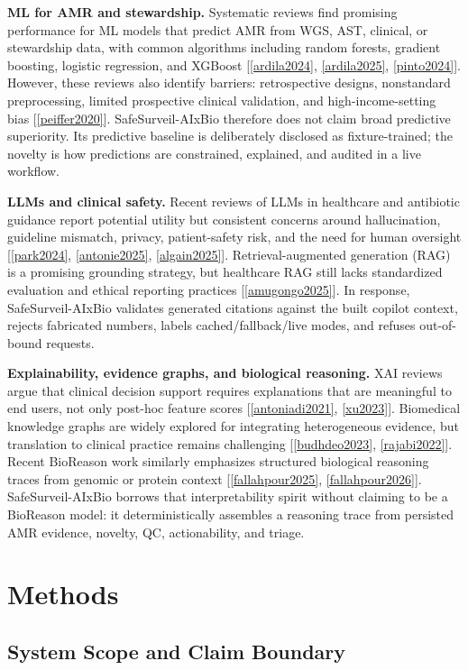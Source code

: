 \documentclass[11pt, letterpaper]{article}
\newcommand{\project}{SafeSurveil-AIxBio}
\newcommand{\pcite}[1]{[\ref{#1}]}
\begin{document}
\textbf{ML for AMR and stewardship.} Systematic reviews find promising performance for ML models that predict AMR from WGS, AST, clinical, or stewardship data, with common algorithms including random forests, gradient boosting, logistic regression, and XGBoost [\ref{ardila2024}, \ref{ardila2025}, \ref{pinto2024}]. However, these reviews also identify barriers: retrospective designs, nonstandard preprocessing, limited prospective clinical validation, and high-income-setting bias \pcite{peiffer2020}. \project{} therefore does not claim broad predictive superiority. Its predictive baseline is deliberately disclosed as fixture-trained; the novelty is how predictions are constrained, explained, and audited in a live workflow.

\textbf{LLMs and clinical safety.} Recent reviews of LLMs in healthcare and antibiotic guidance report potential utility but consistent concerns around hallucination, guideline mismatch, privacy, patient-safety risk, and the need for human oversight [\ref{park2024}, \ref{antonie2025}, \ref{algain2025}]. Retrieval-augmented generation (RAG) is a promising grounding strategy, but healthcare RAG still lacks standardized evaluation and ethical reporting practices \pcite{amugongo2025}. In response, \project{} validates generated citations against the built copilot context, rejects fabricated numbers, labels cached/fallback/live modes, and refuses out-of-bound requests.

\textbf{Explainability, evidence graphs, and biological reasoning.} XAI reviews argue that clinical decision support requires explanations that are meaningful to end users, not only post-hoc feature scores [\ref{antoniadi2021}, \ref{xu2023}]. Biomedical knowledge graphs are widely explored for integrating heterogeneous evidence, but translation to clinical practice remains challenging [\ref{budhdeo2023}, \ref{rajabi2022}]. Recent BioReason work similarly emphasizes structured biological reasoning traces from genomic or protein context [\ref{fallahpour2025}, \ref{fallahpour2026}]. \project{} borrows that interpretability spirit without claiming to be a BioReason model: it deterministically assembles a reasoning trace from persisted AMR evidence, novelty, QC, actionability, and triage.

\section{Methods}

\subsection*{System Scope and Claim Boundary}
\end{document}
